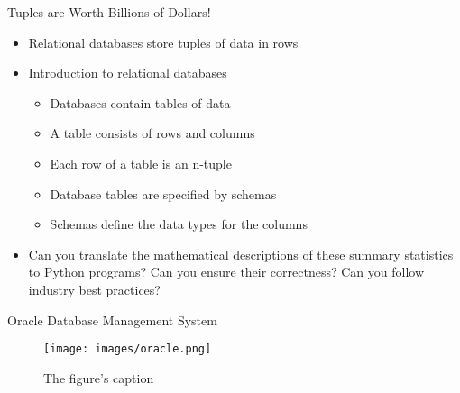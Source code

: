\documentclass[14pt,aspectratio=169]{beamer}
\begin{document}
%
\begin{frame}{Tuples are Worth Billions of Dollars!}
  \begin{itemize}
    \item Relational databases store tuples of data in rows
      \vspace*{-.15in}
    \item Introduction to relational databases
      \begin{itemize}
        \item Databases contain tables of data
        \item A table consists of rows and columns
        \item Each row of a table is an n-tuple
        \item Database tables are specified by schemas
        \item Schemas define the data types for the columns
      \end{itemize}
      \vspace*{-.2in}
    \item Can you translate the mathematical descriptions of these summary
      statistics to Python programs? Can you ensure their correctness? Can you
      follow industry best practices?
  \end{itemize}
\end{frame}

%
\begin{frame}{Oracle Database Management System}
  \begin{figure}
    \centering
    \texttt{[image: images/oracle.png]}
    \caption{The figure's caption}
  \end{figure}
\end{frame}
\end{document}
